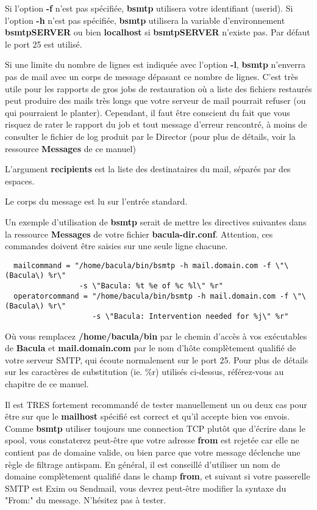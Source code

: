 Si l'option {\bf -f} n'est pas spécifiée, {\bf bsmtp} utilisera votre 
identifiant (userid). Si l'option {\bf -h} n'est pas spécifiée, {\bf bsmtp} 
utilisera la variable d'environnement {\bf bsmtpSERVER} ou bien {\bf localhost}
si {\bf bsmtpSERVER} n'existe pas. Par défaut le port 25 est utilisé.

Si une limite du nombre de lignes est indiquée avec l'option {\bf -l}, 
{\bf bsmtp} n'enverra pas de mail avec un corps de message dépasant ce nombre
de lignes. C'est très utile pour les rapports de gros jobs de restauration où
a liste des fichiers restaurés peut produire des mails très longs que votre
serveur de mail pourrait refuser (ou qui pourraient le planter). Cependant, il
faut être conscient du fait que vous risquez de rater le rapport du job et tout
message d'erreur rencontré, à moins de consulter le fichier de log produit par 
le Director (pour plus de détails, voir la ressource {\bf Messages} de ce manuel)


L'argument {\bf recipients} est la liste des destinataires du mail, séparés par
des espaces.

Le corps du message est lu sur l'entrée standard.

Un exemple d'utilisation de {\bf bsmtp} serait de mettre les directives 
suivantes dans la ressource {\bf Messages} de votre fichier 
{\bf bacula-dir.conf}. Attention, ces commandes doivent être saisies sur une 
seule ligne chacune.

\footnotesize
\begin{verbatim}
  mailcommand = "/home/bacula/bin/bsmtp -h mail.domain.com -f \"\(Bacula\) %r\"
                 -s \"Bacula: %t %e of %c %l\" %r"
  operatorcommand = "/home/bacula/bin/bsmtp -h mail.domain.com -f \"\(Bacula\) %r\"
                    -s \"Bacula: Intervention needed for %j\" %r"
\end{verbatim}
\normalsize

Où vous remplacez {\bf /home/bacula/bin} par le chemin d'accès à vos exécutables
de {\bf Bacula} et {\bf mail.domain.com} par le nom d'hôte complètement qualifié
de votre serveur SMTP, qui écoute normalement sur le port 25. Pour plus de 
détails sur les caractères de substitution (ie. \%r) utilisés ci-dessus, 
référez-vous au chapitre 
 de ce manuel. 

Il est TRES fortement recommandé de tester manuellement un ou deux cas pour 
être sur que le {\bf mailhost} spécifié est correct et qu'il accepte bien vos
envois. Comme {\bf bsmtp} utiliser toujours une connection TCP plutôt que 
d'écrire dans le spool, vous constaterez peut-être que votre adresse {\bf from} 
est rejetée car elle ne contient pas de domaine valide, ou bien parce que votre
message déclenche une règle de filtrage antispam. En général, il est conseillé
d'utiliser un nom de domaine complètement qualifié dans le champ {\bf from}, et 
suivant si votre passerelle SMTP est Exim ou Sendmail, vous devrez peut-être
modifier la syntaxe du "From:" du message. N'hésitez pas à tester.


